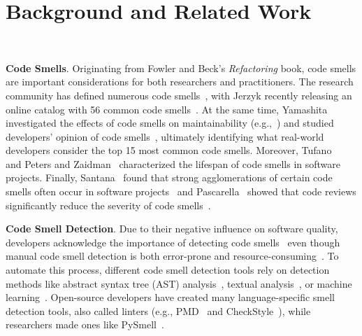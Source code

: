 \vspace*{-0.5em}

\section{Background and Related Work}~\label{sec:background}

\vspace*{-1em}


{\bf Code Smells}. Originating from Fowler and Beck's \textit{Refactoring} book,
code smells are important considerations for both researchers and practitioners.
The research community has defined numerous code
smells~\cite{Pysmell,SQLAntipatterns,CleanCode,RefactoringWorkbook}, with Jerzyk
recently releasing an online catalog with 56 common code smells~\cite{Jerzyk2023}. At the same time, Yamashita investigated the effects of code
smells on maintainability (e.g.,~\cite{6392174, 6405287}) and studied
developers' opinion of code smells~\cite{developersCare}, ultimately identifying
what real-world developers consider the top 15 most common code smells.
Moreover, Tufano~\etal{}~\cite{whenandwhy} and Peters and
Zaidman~\cite{lifespan} characterized the lifespan of code smells in software
projects. Finally, Santana~\etal{} found that strong agglomerations of certain
code smells often occur in software projects~\cite{Santana} and
Pascarella~\etal{} showed that code reviews significantly reduce the severity of
code smells~\cite{Pascarella}.



{\bf Code Smell Detection}. Due to their negative influence on software quality,
developers acknowledge the importance of detecting code
smells~\cite{developersCare} even though manual code smell detection is both
error-prone and resource-consuming~\cite{DetectingDefectsInObject}.
%
To automate this process, different code smell detection tools rely on detection
methods like abstract syntax tree (AST) analysis~\cite{Lenarduzzi2023}, textual
analysis~\cite{Palomba}, or machine learning~\cite{ML}.
%
Open-source developers have created many language-specific smell detection
tools, also called linters (e.g., PMD~\cite{PMD} and
CheckStyle~\cite{CheckStyle}), while researchers made ones like
PySmell~\cite{Pysmell}.

